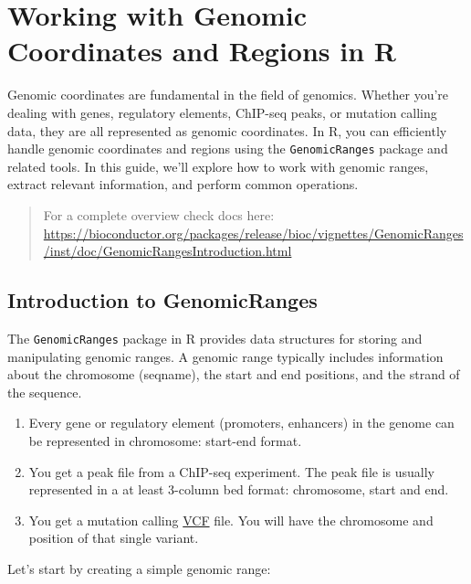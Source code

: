 \documentclass[
]{book}
\begin{document}
\hypertarget{working-with-genomic-coordinates-and-regions-in-r}{%
\section{Working with Genomic Coordinates and Regions in R}\label{working-with-genomic-coordinates-and-regions-in-r}}

Genomic coordinates are fundamental in the field of genomics. Whether you're dealing with genes, regulatory elements, ChIP-seq peaks, or mutation calling data, they are all represented as genomic coordinates. In R, you can efficiently handle genomic coordinates and regions using the \texttt{GenomicRanges} package and related tools. In this guide, we'll explore how to work with genomic ranges, extract relevant information, and perform common operations.

\begin{quote}
For a complete overview check docs here: \url{https://bioconductor.org/packages/release/bioc/vignettes/GenomicRanges/inst/doc/GenomicRangesIntroduction.html}
\end{quote}

\hypertarget{introduction-to-genomicranges}{%
\subsection{Introduction to GenomicRanges}\label{introduction-to-genomicranges}}

The \texttt{GenomicRanges} package in R provides data structures for storing and manipulating genomic ranges. A genomic range typically includes information about the chromosome (seqname), the start and end positions, and the strand of the sequence.

\begin{enumerate}
\def\labelenumi{\arabic{enumi}.}
\item
  Every gene or regulatory element (promoters, enhancers) in the genome can be represented in chromosome: start-end format.
\item
  You get a peak file from a ChIP-seq experiment. The peak file is usually represented in a at least 3-column bed format: chromosome, start and end.
\item
  You get a mutation calling \href{https://genome.ucsc.edu/goldenPath/help/vcf.html}{VCF} file. You will have the chromosome and position of that single variant.
\end{enumerate}

Let's start by creating a simple genomic range:
\end{document}
